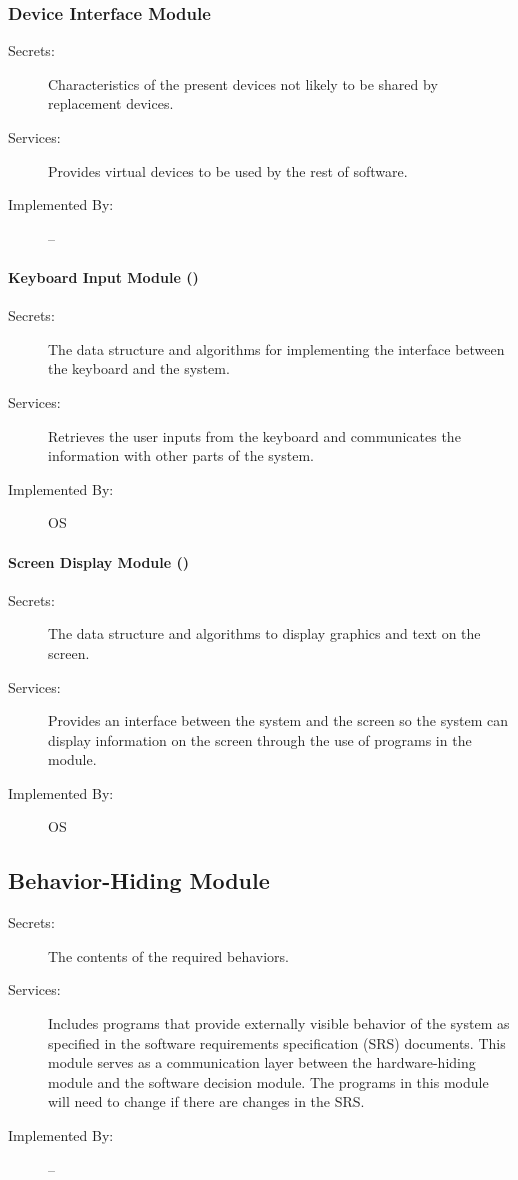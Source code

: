\documentclass[12pt,titlepage]{article}
\begin{document}
\subsubsection{Device Interface Module}
\begin{description}
\item[Secrets:]Characteristics of the present devices not likely to be shared by replacement devices.
\item[Services:]Provides virtual devices to be used by the rest of software.
\item[Implemented By:] --
\end{description}

\paragraph{Keyboard Input Module ()}
\begin{description}
\item[Secrets:]The data structure and algorithms for implementing the interface between the keyboard and the system.
\item[Services:]Retrieves the user inputs from the keyboard and communicates the information with other parts of the system.
\item[Implemented By:] OS
\end{description}

\paragraph{Screen Display Module ()}
\begin{description}
\item[Secrets:]The data structure and algorithms to display graphics and text on the screen.
\item[Services:]Provides an interface between the system and the screen so the system can display information on the screen through the use of programs in the module.
\item[Implemented By:] OS
\end{description}


\subsection{Behavior-Hiding Module}
\begin{description}
\item[Secrets:]The contents of the required behaviors.
\item[Services:]Includes programs that provide externally visible behavior of the system as specified in the software requirements specification (SRS) documents. This module serves as a communication layer between the hardware-hiding module and the software decision module. The programs in this module will need to change if there are changes in the SRS. 
\item[Implemented By:] --
\end{description}
\end{document}
